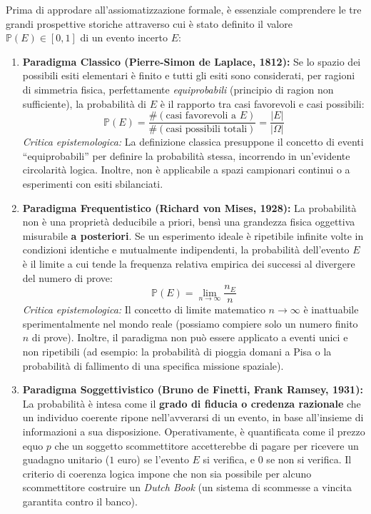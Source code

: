 Prima di approdare all'assiomatizzazione formale, è essenziale comprendere le tre grandi prospettive storiche attraverso cui è stato definito il valore $\mathbb{P}(E) \in [0, 1]$ di un evento incerto $E$:

\begin{enumerate}
    \item \textbf{Paradigma Classico (Pierre-Simon de Laplace, 1812):}
    Se lo spazio dei possibili esiti elementari è finito e tutti gli esiti sono considerati, per ragioni di simmetria fisica, perfettamente \emph{equiprobabili} (principio di ragion non sufficiente), la probabilità di $E$ è il rapporto tra casi favorevoli e casi possibili:
    \begin{equation}
        \mathbb{P}(E) = \frac{\#(\text{casi favorevoli a } E)}{\#(\text{casi possibili totali})} = \frac{|E|}{|\Omega|}
    \end{equation}
    \emph{Critica epistemologica:} La definizione classica presuppone il concetto di eventi ``equiprobabili'' per definire la probabilità stessa, incorrendo in un'evidente circolarità logica. Inoltre, non è applicabile a spazi campionari continui o a esperimenti con esiti sbilanciati.

    \item \textbf{Paradigma Frequentistico (Richard von Mises, 1928):}
    La probabilità non è una proprietà deducibile a priori, bensì una grandezza fisica oggettiva misurabile \textbf{a posteriori}. Se un esperimento ideale è ripetibile infinite volte in condizioni identiche e mutualmente indipendenti, la probabilità dell'evento $E$ è il limite a cui tende la frequenza relativa empirica dei successi al divergere del numero di prove:
    \begin{equation}
        \mathbb{P}(E) = \lim_{n \to \infty} \frac{n_E}{n}
    \end{equation}
    \emph{Critica epistemologica:} Il concetto di limite matematico $n \to \infty$ è inattuabile sperimentalmente nel mondo reale (possiamo compiere solo un numero finito $n$ di prove). Inoltre, il paradigma non può essere applicato a eventi unici e non ripetibili (ad esempio: la probabilità di pioggia domani a Pisa o la probabilità di fallimento di una specifica missione spaziale).

    \item \textbf{Paradigma Soggettivistico (Bruno de Finetti, Frank Ramsey, 1931):}
    La probabilità è intesa come il \textbf{grado di fiducia o credenza razionale} che un individuo coerente ripone nell'avverarsi di un evento, in base all'insieme di informazioni a sua disposizione. Operativamente, è quantificata come il prezzo equo $p$ che un soggetto scommettitore accetterebbe di pagare per ricevere un guadagno unitario ($1$ euro) se l'evento $E$ si verifica, e $0$ se non si verifica. Il criterio di coerenza logica impone che non sia possibile per alcuno scommettitore costruire un \emph{Dutch Book} (un sistema di scommesse a vincita garantita contro il banco).
\end{enumerate}

